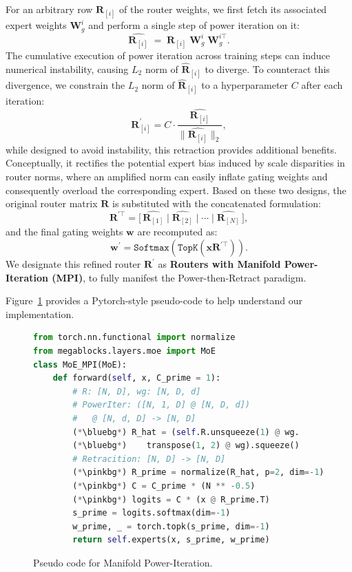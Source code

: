 \documentclass{llmxive}
\providecommand{\bm}[1]{\boldsymbol{#1}}
\providecommand{\bluebg}{  \rlap{        \hspace{-3.2em}    \rule[-0.35em]{\dimexpr\linewidth}{1.2em}  }}
\providecommand{\pinkbg}{  \rlap{        \hspace{-3.2em}    \rule[-0.35em]{\dimexpr\linewidth}{1.2em}  }}
\providecommand{\vw}{{\bm{w}}}
\providecommand{\vx}{{\bm{x}}}
\providecommand{\mR}{{\bm{R}}}
\providecommand{\mW}{{\bm{W}}}
\begin{document}
For an arbitrary row $\mR_{[i]}$ of the router weights, we first fetch its associated expert weights $\mW_g^i$  and perform a single step of power iteration on it:
\begin{equation}
    \hat{\mR_{[i]}} \; = \; \mR_{[i]} \; \mW_g^i \; \mW_g^{i\top}.
    \label{eq:power}
\end{equation}
The cumulative execution of power iteration across training steps can induce numerical instability, causing $L_2$ norm of $\hat{\mathbf{R}}_{[i]}$ to diverge.
To counteract this divergence, we constrain the $L_2$ norm of $\hat{\mathbf{R}}_{[i]}$ to a hyperparameter $C$ after each iteration:
\begin{equation}
    \mR_{[i]}^\prime = C \cdot \frac{\hat{\mR_{[i]}}}{\|\hat{\mR_{[i]}}\|_2},
\end{equation}
while designed to avoid instability, this retraction provides additional benefits. 
Conceptually, it rectifies the potential expert bias induced by scale disparities in router norms, where an amplified norm can easily inflate gating weights and consequently overload the corresponding expert. 
Based on these two designs, the original router matrix $\mR$ is substituted with the concatenated formulation:
\[
    \mR^{\prime\top} = \big[ \, \hat{\mR_{[1]}} \mid \hat{\mR_{[2]}} \mid \cdots \mid \hat{\mR_{[N]}} \, \big],
\]
and the final gating weights \(\vw\) are recomputed as:
\begin{equation}
    \vw^\prime = \texttt{Softmax}\left(\texttt{TopK}\left(\vx\mR^{\prime\top}\right)\right).
\end{equation}
We designate this refined router $\mR^\prime$ as \textbf{Routers with Manifold Power-Iteration (MPI)}, to fully manifest the Power-then-Retract paradigm.

Figure~\ref{fig:code} provides a Pytorch-style pseudo-code to help understand our implementation.
\begin{figure}[!htbp]
\begin{lstlisting}[language={Python}]
from torch.nn.functional import normalize
from megablocks.layers.moe import MoE
class MoE_MPI(MoE):
    def forward(self, x, C_prime = 1):
        # R: [N, D], wg: [N, D, d]
        # PowerIter: ([N, 1, D] @ [N, D, d]) 
        #   @ [N, d, D] -> [N, D]
        (*\bluebg*) R_hat = (self.R.unsqueeze(1) @ wg.
        (*\bluebg*)    transpose(1, 2) @ wg).squeeze()
        # Retracition: [N, D] -> [N, D] 
        (*\pinkbg*) R_prime = normalize(R_hat, p=2, dim=-1)
        (*\pinkbg*) C = C_prime * (N ** -0.5)
        (*\pinkbg*) logits = C * (x @ R_prime.T)
        s_prime = logits.softmax(dim=-1)
        w_prime, _ = torch.topk(s_prime, dim=-1)
        return self.experts(x, s_prime, w_prime)        
\end{lstlisting}
\caption{Pseudo code for Manifold Power-Iteration.}
\label{fig:code}
\end{figure}
\end{document}
